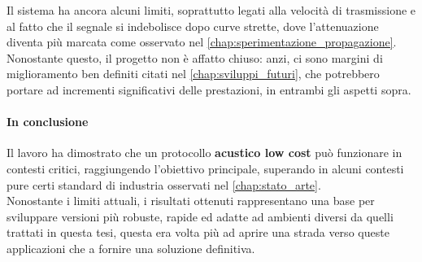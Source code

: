   Il sistema ha ancora alcuni limiti, soprattutto legati alla velocità di trasmissione
    e al fatto che il segnale si indebolisce dopo curve strette, dove l’attenuazione diventa più marcata come osservato nel \autoref{chap:sperimentazione_propagazione}.\\
     Nonostante questo, il progetto non è affatto chiuso: anzi, ci sono margini di miglioramento ben definiti citati nel \autoref{chap:sviluppi_futuri},
     che potrebbero portare ad incrementi significativi delle prestazioni, in entrambi gli aspetti sopra.

   \paragraph{In conclusione} 
   Il lavoro ha dimostrato che un protocollo \textbf{acustico low cost} può funzionare in contesti critici, raggiungendo
    l’obiettivo principale, superando in alcuni contesti pure certi standard di industria osservati nel \autoref{chap:stato_arte}.\\
     Nonostante i limiti attuali, i risultati ottenuti rappresentano una base per sviluppare versioni più robuste, rapide ed adatte ad ambienti
     diversi da quelli trattati in questa tesi, questa era volta più ad aprire una strada verso queste applicazioni che a fornire una soluzione definitiva.\\
